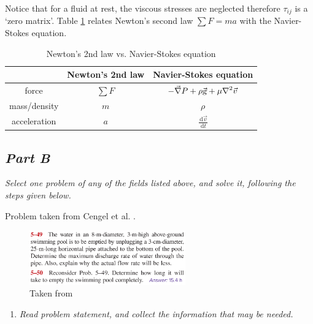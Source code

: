\documentclass{article}
\newcommand{\ud}{\,\mathrm{d}}
\begin{document}
Notice that for a fluid at rest, the viscous stresses are neglected therefore $\tau_{ij}$ is a   `zero matrix'. Table \ref{tb_NewtonNavierStokes} relates Newton's second law $\displaystyle \sum F = m a$ with the Navier-Stokes equation.

\begin{table}[h!]
\caption{Newton's 2nd law vs. Navier-Stokes equation}
\begin{center}
\begin{tabular}{ c | c   c }
                 & Newton's 2nd law & Navier-Stokes equation \\
    \hline
    force        & $\displaystyle \sum F$ & $\displaystyle - \vec{\nabla} P + \rho \vec{\textsl{g}} + \mu \nabla^2 \vec{v}$ \\
    mass/density & $\displaystyle m$ & $\displaystyle \rho$ \\
    acceleration & $\displaystyle a$ & $\displaystyle \frac{\ud \vec{v}}{\ud t}$
\end{tabular}
\end{center}
\label{tb_NewtonNavierStokes}
\end{table}

\subsection*{\emph{Part B}}
\textit{Select one problem of any of the fields listed above, and solve it, following the steps given below.}

Problem taken from Cengel et al. \cite{Cengel2017}.

\begin{figure}[h!]
\centering
\includegraphics[width=0.60\textwidth]{./img/PROBLEMBernoulliEquation.png}
\caption{Taken from \cite{Cengel2017}}
\label{fig_PROBLEMBernoulliEquation}
\end{figure}

\begin{enumerate}
\item \textit{Read problem statement, and collect the information that may be needed.}
\end{enumerate}
\end{document}
